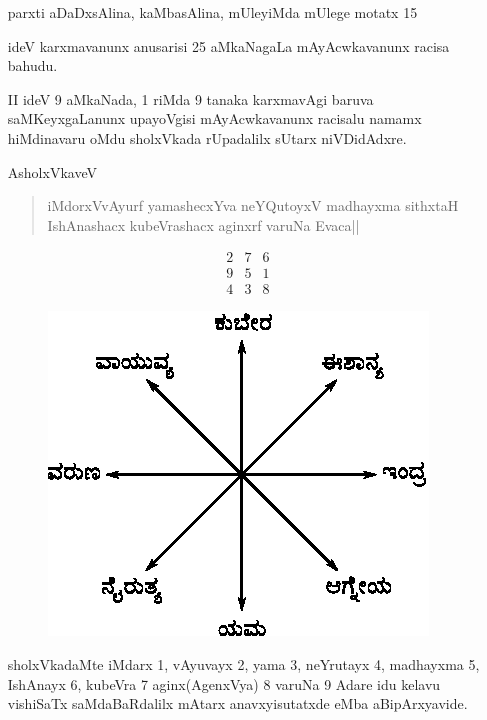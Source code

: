 \begin{enumerate}
parxti aDaDxsAlina, kaMbasAlina, mUleyiMda mUlege motatx {\rm 15}

ideV karxmavanunx anusarisi {\rm 25} aMkaNagaLa mAyAcwkavanunx racisa bahudu.

\item[{\rm II}] ideV {\rm 9} aMkaNada, {\rm 1} riMda {\rm 9} tanaka karxmavAgi baruva saMKeyxgaLanunx upayoVgisi mAyAcwkavanunx racisalu namamx hiMdinavaru oMdu sholxVkada rUpadalilx sUtarx niVDidAdxre.

AsholxVkaveV 
\begin{verse}
iMdorxVvAyurf yamashecxYva neYQutoyxV madhayxma sithxtaH\\ 
IshAnashacx kubeVrashacx aginxrf varuNa Evaca||
\end{verse}
$$
\begin{matrix}
2 & 7 & 6\\
9 & 5 & 1\\
4 & 3 & 8
\end{matrix}
$$

\begin{figure}[H]
\centering
\includegraphics[scale=.8]{src/figures/m_117.eps}
\end{figure}

sholxVkadaMte iMdarx {\rm 1}, vAyuvayx {\rm 2}, yama {\rm 3}, neYrutayx {\rm 4}, madhayxma {\rm 5}, IshAnayx {\rm 6}, kubeVra {\rm 7} aginx(AgenxVya) {\rm 8} varuNa {\rm 9} Adare idu kelavu vishiSaTx saMdaBaRdalilx mAtarx anavxyisutatxde eMba aBipArxyavide.


\end{enumerate}
